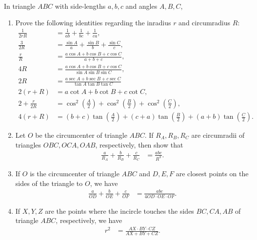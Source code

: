 \documentclass[12pt,a4paper]{memoir}
\theoremstyle{definition}
\begin{document}
	\begin{question}[name={Makshud's Identities on Circumradius and Inradius}]
		In triangle $ABC$ with side-lengths $a,b,c$ and angles $A,B,C$, 
		\begin{enumerate}
			\item Prove the following identities regarding the inradius $r$ and circumradius $R$:
			\begin{align*}
				\frac{1}{2rR} &= \frac{1}{ab}+\frac{1}{bc}+\frac{1}{ca},\\
				\frac{3}{2R} &= \frac{\sin A}{a}+\frac{\sin B}{b}+\frac{\sin C}{c},\\
				\frac{r}{R} &= \frac{a\cos A + b\cos B + c\cos C}{a+b+c},\\
				4R &= \frac{a\cos A + b\cos B + c\cos C}{\sin A \sin B \sin C},\\
				2R &= \frac{a\sec A + b\sec B + c\sec C}{\tan A \tan B \tan C}\\
				2(r+R) &= a\cot A + b\cot B + c\cot C,\\
				2+\frac{r}{2R} &= \cos^2\left(\frac{A}{2}\right)+\cos^2\left(\frac{B}{2}\right)+\cos^2\left(\frac{C}{2}\right),\\
				4(r+R) &= (b+c)\tan\left(\frac{A}{2}\right) + (c+a)\tan\left(\frac{B}{2}\right) + (a+b)\tan\left(\frac{C}{2}\right).
			\end{align*}
			\item Let $O$ be the circumcenter of triangle $ABC$. If $R_A, R_B, R_C$ are circumradii of triangles $OBC, OCA, OAB$, respectively, then show that
			\begin{align*}
				\frac{a}{R_A} + \frac{b}{R_B} + \frac{c}{R_C} &= \frac{abc}{R^3}.
			\end{align*}
			\item If $O$ is the circumcenter of triangle $ABC$ and $D,E,F$ are closest points on the sides of the triangle to $O$, we have
			\begin{align*}
				\frac{a}{OD}+\frac{b}{OE}+\frac{c}{OF} &= \frac{abc}{4OD\cdot OE \cdot OF}.
			\end{align*}
			\item If $X,Y,Z$ are the points where the incircle touches the sides $BC, CA, AB$ of triangle $ABC$, respectively, we have
			\begin{align*}
				r^2 &= \frac{AX \cdot BY \cdot CZ}{AX+BY+CZ}.
			\end{align*}
		\end{enumerate}
	\end{question}
\end{document}
